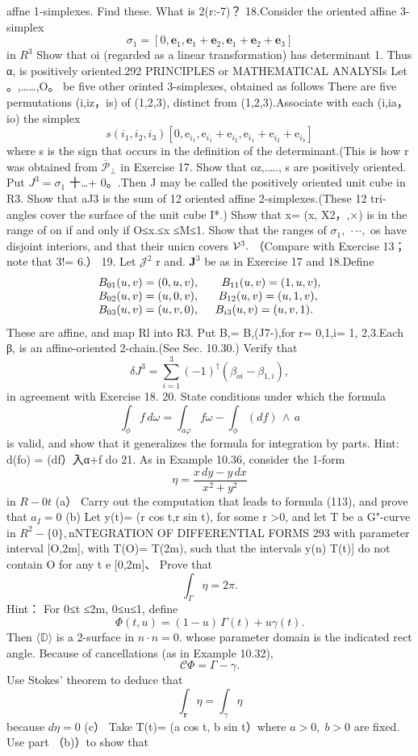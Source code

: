 affne 1-simplexes. Find these. What is 2(r:-7)？ 18.Consider the oriented affine 3-simplex $$ \sigma_{1}=[0,\mathbf{e}_{1},\mathbf{e}_{1}+\mathbf{e}_{2},\mathbf{e}_{1}+\mathbf{e}_{2}+\mathbf{e}_{3}] $$ in $R^{3}$ Show that oi (regarded as a linear transformation) has determinant 1. Thus α, is positively oriented.292 PRINCIPLES or MATHEMATICAL ANALYSIs Let 。,……,O。 be five other orinted 3-simplexes, obtained as follows There are five permutations (i,iz，is) of (1,2,3), distinct from (1,2,3).Associate with each (i,ia，io) the simplex $$ s(i_{1},i_{2},i_{3})[0,\mathrm{e}_{i_{1}},\mathrm{e}_{i_{1}}+\mathrm{e}_{i_{2}},\mathrm{e}_{i_{1}}+\mathrm{e}_{i_{2}}+\mathrm{e}_{i_{3}}] $$ where s is the sign that occurs in the definition of the determinant.(This is how r was obtained from ${\overline{{\mathcal{P}}}}_{\perp}$ in Exercise 17. Show that oz,.…., s are positively oriented. Put $J^{3}=\sigma_{1}$ 十…+ 0。.Then J may be called the positively oriented unit cube in R3. Show that aJ3 is the sum of 12 oriented affine 2-simplexes.(These 12 tri- angles cover the surface of the unit cube I*.) Show that x= (x, X2，,×) is in the range of on if and only if O≤x.≤x ≤M≤1. Show that the ranges of $\sigma_{1},\,\cdot\cdot\cdot,$ os have disjoint interiors, and that their unicn covers ${\cal{V}}^{3}.$ （Compare with Exercise 13； note that 3!= 6.） 19. Let ${\mathcal{J}}^{2}$ r and. ${\boldsymbol{J}}^{3}$ be as in Exercise 17 and 18.Define $$ \begin{array}{l l}{{B_{01}(u,v)=(0,u,v),\;\;\;\;\;\;\;B_{11}(u,v)=(1,u,v),}}\\ {{B_{02}(u,v)=(u,0,v),\;\;\;\;\;\;B_{12}(u,v)=(u,1,v),}}\\ {{B_{03}(u,v)=(u,v,0),\;\;\;\;\;B_{i3}(u,v)=(u,v,1).}}\end{array} $$ These are affine, and map Rl into R3. Put B,= B,(J7-),for r= 0,1,i= 1, 2,3.Each β, is an affine-oriented 2-chain.(See Sec. 10.30.) Verify that $$ {\delta J}^{3}=\sum_{i=1}^{3}(-1)^{\dagger}(\beta_{o i}-\beta_{1,i}), $$ in agreement with Exercise 18. 20. State conditions under which the formula $$ \int_{\phi}f\,d\omega=\int_{a\varphi}f\omega-\int_{\phi}(d f)\,\wedge\,a $$ is valid, and show that it generalizes the formula for integration by parts. Hint: d(fo) = (df）入α+f do 21. As in Example 10.36, consider the 1-form $$ \eta={\frac{x\,d y-y\,d x}{x^{2}+y^{2}}} $$ in $\scriptstyle{R-0t}$ (a） Carry out the computation that leads to formula (113), and prove that $a_{I}=0$ (b) Let y(t)= (r cos t,r sin t), for some r >0, and let T be a G"-curve in $R^{2}-\{0\},$nNTEGRATION OF DIFFERENTIAL FORMS 293 with parameter interval [O,2m], with T(O)= T(2m), such that the intervals y(n) T(t)] do not contain O for any t e [0,2m]、 Prove that $$ \int_{\Gamma}\eta=2\pi. $$ Hint： For 0≤t ≤2m, 0≤u≤1, define $$ \Phi(t,u)=(1-u)\,\Gamma(t)+u\gamma(t). $$ Then $\langle{\mathbb{D}}\rangle$ is a 2-surface in $\scriptstyle n\cdot n=0.$ whose parameter domain is the indicated rect angle. Because of cancellations (as in Example 10.32), $$ {\mathcal{C}}\Phi=\Gamma-\gamma. $$ Use Stokes' theorem to deduce that $$ \int_{\mathbf{r}}\eta=\int_{\gamma}\eta $$ because $d\eta=0$ (c） Take T(t)= (a cos t, b sin t）where $a>0,\;b>0$ are fixed. Use part （b)）to show that $$ 